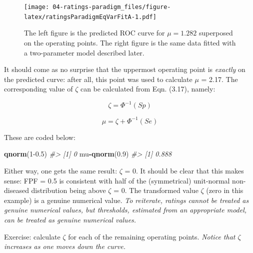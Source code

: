 \documentclass[
]{book}
\newenvironment{Shaded}{\begin{snugshade}}{\end{snugshade}}
\newcommand{\CommentTok}[1]{\textcolor[rgb]{0.56,0.35,0.01}{\textit{#1}}}
\newcommand{\DecValTok}[1]{\textcolor[rgb]{0.00,0.00,0.81}{#1}}
\newcommand{\FloatTok}[1]{\textcolor[rgb]{0.00,0.00,0.81}{#1}}
\newcommand{\KeywordTok}[1]{\textcolor[rgb]{0.13,0.29,0.53}{\textbf{#1}}}
\newcommand{\NormalTok}[1]{#1}
\newcommand{\OperatorTok}[1]{\textcolor[rgb]{0.81,0.36,0.00}{\textbf{#1}}}
\begin{document}
\begin{figure}
\centering
\texttt{[image: 04-ratings-paradigm\_files/figure-latex/ratingsParadigmEqVarFitA-1.pdf]}
\caption{\label{fig:ratingsParadigmEqVarFitA}The left figure is the predicted ROC curve for \(\mu=1.282\) superposed on the operating points. The right figure is the same data fitted with a two-parameter model described later.}
\end{figure}

It should come as no surprise that the uppermost operating point is \emph{exactly} on the predicted curve: after all, this point was used to calculate \(\mu\) = 2.17. The corresponding value of \(\zeta\) can be calculated from Eqn. (3.17), namely:

\begin{equation*} 
\zeta = \Phi^{-1}\left ( Sp \right )
\label{eq:ratingsParadigm-Zeta}
\end{equation*}

\begin{equation*} 
\mu = \zeta + \Phi^{-1}\left ( Se \right )
\label{eq:ratingsParadigm-Mu}
\end{equation*}

These are coded below:

\begin{Shaded}
\begin{Highlighting}[]
\KeywordTok{qnorm}\NormalTok{(}\DecValTok{1}\FloatTok{{-}0.5}\NormalTok{)}
\CommentTok{\#\textgreater{} [1] 0}
\NormalTok{mu}\OperatorTok{{-}}\KeywordTok{qnorm}\NormalTok{(}\FloatTok{0.9}\NormalTok{)}
\CommentTok{\#\textgreater{} [1] 0.888}
\end{Highlighting}
\end{Shaded}

Either way, one gets the same result: \(\zeta\) = 0. It should be clear that this makes sense: FPF = 0.5 is consistent with half of the (symmetrical) unit-normal non-diseased distribution being above \(\zeta\) = 0. The transformed value \(\zeta\) (zero in this example) is a genuine numerical value. \emph{To reiterate, ratings cannot be treated as genuine numerical values, but thresholds, estimated from an appropriate model, can be treated as genuine numerical values.}

Exercise: calculate \(\zeta\) for each of the remaining operating points. \emph{Notice that \(\zeta\) increases as one moves down the curve.}
\end{document}
